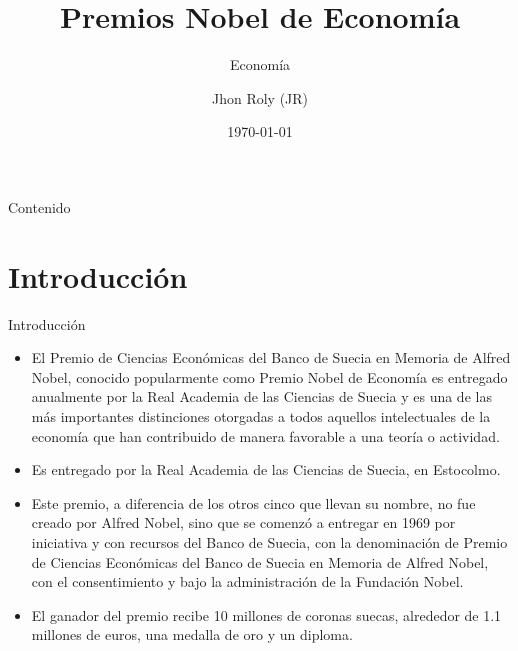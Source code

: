 \documentclass[aspectratio=169]{beamer}
\title{Premios Nobel de Economía}
\subtitle{Economía}
\author[JR]{Jhon Roly (JR)}
\institute{
            Universidad Nacional de San Cristóbal de Huamanga\\
            Facultad de Ciencias Económicas, Administrativas y Contables\\
            Escuela Profesional de Economía
        }
\date{\today}
\begin{document}
    \begin{frame}
        \titlepage
    \end{frame}
    \begin{frame}{Contenido}
        \tableofcontents
    \end{frame}
    \section{Introducción}
        \begin{frame}[t]{Introducción}
            \justify
            \begin{itemize}
                \item El Premio de Ciencias Económicas del Banco de Suecia en Memoria
                de Alfred Nobel, conocido popularmente como Premio Nobel de Economía
                es entregado anualmente por la Real Academia de las Ciencias de Suecia 
                y es una de las más importantes distinciones otorgadas a todos aquellos 
                intelectuales de la economía que han contribuido de manera favorable a 
                una teoría o actividad.
                \item Es entregado por la Real Academia de las Ciencias de Suecia, en Estocolmo.
                \item Este premio, a diferencia de los otros cinco que llevan su nombre, no fue 
                creado por Alfred Nobel, sino que se comenzó a entregar en 1969 por iniciativa 
                y con recursos del Banco de Suecia, con la denominación de Premio de Ciencias 
                Económicas del Banco de Suecia en Memoria de Alfred Nobel, con el consentimiento 
                y bajo la administración de la Fundación Nobel.
                \item El ganador del premio recibe 10 millones de coronas suecas, alrededor de 
                1.1 millones de euros, una medalla de oro y un diploma.
            \end{itemize}
        \end{frame}   
\end{document}
